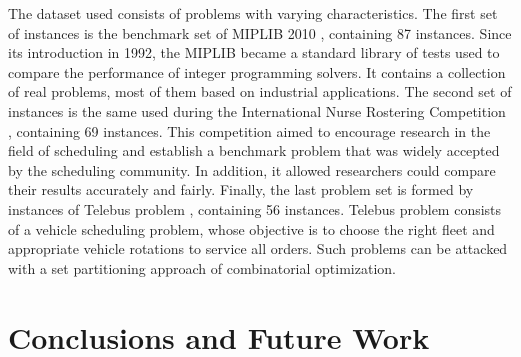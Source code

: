 \documentclass{endm}
\begin{document}
The dataset used consists of problems with varying characteristics. The first set of instances is the benchmark set of MIPLIB 2010 \cite{miplib}, containing 87 instances. Since its introduction in 1992, the MIPLIB became a standard library of tests used to compare the performance of integer programming solvers. It contains a collection of real problems, most of them based on industrial applications. The second set of instances is the same used during the International Nurse Rostering Competition \cite{haspeslagh}, containing 69 instances. This competition aimed to encourage research in the field of scheduling and establish a benchmark problem that was widely accepted by the scheduling community. In addition, it allowed researchers could compare their results accurately and fairly. Finally, the last problem set is formed by instances of Telebus problem \cite{Borndorfer1998}, containing 56 instances. Telebus problem consists of a vehicle scheduling problem, whose objective is to choose the right fleet and appropriate vehicle rotations to service all orders. Such problems can be attacked with a set partitioning approach of combinatorial optimization.


\section{Conclusions and Future Work}\label{conclusions}



\end{document}
